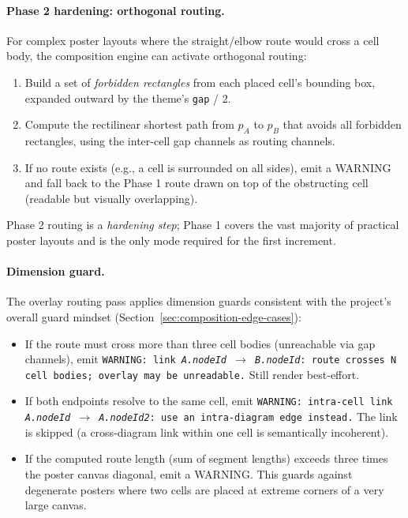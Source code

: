 \paragraph{Phase 2 hardening: orthogonal routing.}

For complex poster layouts where the straight/elbow route would cross a cell
body, the composition engine can activate orthogonal routing:

\begin{enumerate}
  \item Build a set of \emph{forbidden rectangles} from each placed cell's
        bounding box, expanded outward by the theme's \texttt{gap} / 2.
  \item Compute the rectilinear shortest path from $p_A$ to $p_B$ that avoids
        all forbidden rectangles, using the inter-cell gap channels as routing
        channels.
  \item If no route exists (e.g., a cell is surrounded on all sides), emit a
        WARNING and fall back to the Phase 1 route drawn on top of the
        obstructing cell (readable but visually overlapping).
\end{enumerate}

Phase 2 routing is a \emph{hardening step}; Phase 1 covers the vast majority
of practical poster layouts and is the only mode required for the first
increment.

\paragraph{Dimension guard.}

The overlay routing pass applies dimension guards consistent with the
project's overall guard mindset
(Section~\ref{sec:composition-edge-cases}):

\begin{itemize}
  \item If the route must cross more than three cell bodies (unreachable via
        gap channels), emit \texttt{WARNING: link \textit{A.nodeId}
        $\to$ \textit{B.nodeId}: route crosses N cell bodies; overlay may be
        unreadable.}  Still render best-effort.
  \item If both endpoints resolve to the same cell, emit
        \texttt{WARNING: intra-cell link \textit{A.nodeId} $\to$
        \textit{A.nodeId2}: use an intra-diagram edge instead.}  The link is
        skipped (a cross-diagram link within one cell is semantically
        incoherent).
  \item If the computed route length (sum of segment lengths) exceeds three
        times the poster canvas diagonal, emit a WARNING.  This guards against
        degenerate posters where two cells are placed at extreme corners of a
        very large canvas.
\end{itemize}

